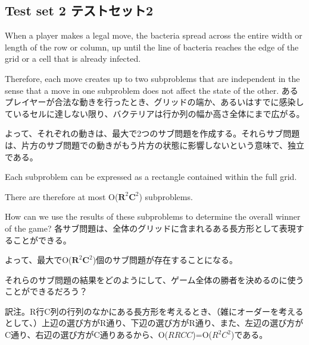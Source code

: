 \documentclass[uplatex,dvipdfmx]{jsarticle} \usepackage{amsmath,amssymb,bm}
\begin{document}
\subsection*{Test set 2 テストセット2}
\begin{paracol}{2}
When a player makes a legal move, the bacteria spread across the entire width or length of the row or column, up until the line of bacteria reaches the edge of the grid or a cell that is already infected.

Therefore, each move creates up to two subproblems that are independent in the sense that a move in one subproblem does not affect the state of the other.
\switchcolumn
あるプレイヤーが合法な動きを行ったとき、グリッドの端か、あるいはすでに感染しているセルに達しない限り、バクテリアは行か列の幅か高さ全体にまで広がる。

よって、それぞれの動きは、最大で2つのサブ問題を作成する。それらサブ問題は、片方のサブ問題での動きがもう片方の状態に影響しないという意味で、独立である。
\end{paracol}
\vspace{\baselineskip}
\begin{paracol}{2}
Each subproblem can be expressed as a rectangle contained within the full grid.

There are therefore at most O($\mathbf{R}^2\mathbf{C}^2$) subproblems.

How can we use the results of these subproblems to determine the overall winner of the game?
\switchcolumn
各サブ問題は、全体のグリッドに含まれるある長方形として表現することができる。

よって、最大でO($\mathbf{R}^2\mathbf{C}^2$)個のサブ問題が存在することになる。

それらのサブ問題の結果をどのようにして、ゲーム全体の勝者を決めるのに使うことができるだろう？
\end{paracol}
\vspace{\baselineskip}
訳注。R行C列の行列のなかにある長方形を考えるとき、（雑にオーダーを考えるとして、）上辺の選び方がR通り、下辺の選び方がR通り、また、左辺の選び方がC通り、右辺の選び方がC通りあるから、O($RRCC$)=O($R^2C^2$)である。
\vspace{\baselineskip}
\end{document}
